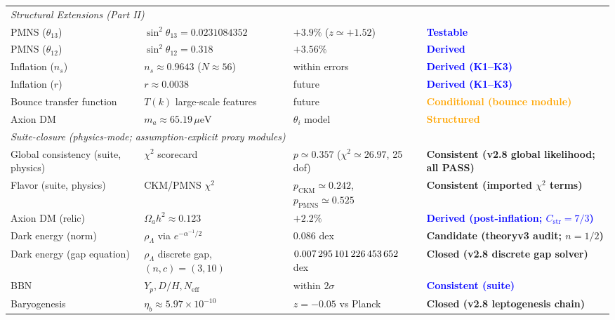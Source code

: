 \begin{longtable}{@{}p{3cm}p{4cm}p{3cm}p{5.2cm}@{}}
\midrule
\multicolumn{4}{l}{\textit{Structural Extensions (Part II)}}\\
\quad PMNS ($\theta_{13}$) & $\sin^2\theta_{13} = \num[round-mode=places,round-precision=5]{0.0231084352}$ & $+3.9\%$ ($z\simeq +1.52$) & \textcolor{blue}{\textbf{Testable}}\\
\quad PMNS ($\theta_{12}$) & $\sin^2\theta_{12} = \num[round-mode=places,round-precision=3]{0.318}$ & $+3.56\%$ & \textcolor{blue}{\textbf{Derived}}\\
\quad Inflation ($n_s$) & $n_s \approx 0.9643$ ($N\approx 56$) & within errors & \textcolor{blue}{\textbf{Derived (K1--K3)}}\\
\quad Inflation ($r$) & $r \approx 0.0038$ & future & \textcolor{blue}{\textbf{Derived (K1--K3)}}\\
\quad Bounce transfer function & $T(k)$ large-scale features & future & \textcolor{orange}{\textbf{Conditional (bounce module)}}\\
\quad Axion DM & $m_a \approx 65.19\,\mu\text{eV}$ & $\theta_i$ model & \textcolor{orange}{\textbf{Structured}}\\
\midrule
\multicolumn{4}{l}{\textit{Suite-closure (physics-mode; assumption-explicit proxy modules)}}\\
\quad Global consistency (suite, physics) & $\chi^2$ scorecard & $p\simeq 0.357$ ($\chi^2\simeq 26.97$, 25 dof) & \textcolor{green!60!black}{\textbf{Consistent (v2.8 global likelihood; all PASS)}}\\
\quad Flavor (suite, physics) & CKM/PMNS $\chi^2$ & $p_{\mathrm{CKM}}\simeq 0.242$, $p_{\mathrm{PMNS}}\simeq 0.525$ & \textcolor{green!60!black}{\textbf{Consistent (imported $\chi^2$ terms)}}\\
\quad Axion DM (relic) & $\Omega_a h^2 \approx 0.123$ & $+2.2\%$ & \textcolor{blue}{\textbf{Derived (post-inflation; $C_{\mathrm{str}}=7/3$)}}\\
\quad Dark energy (norm) & $\rho_\Lambda$ via $e^{-\alpha^{-1}/2}$ & 0.086 dex & \textcolor{green!60!black}{\textbf{Candidate (theoryv3 audit; $n=1/2$)}}\\
\quad Dark energy (gap equation) & $\rho_\Lambda$ discrete gap, $(n,c)=(3,10)$ & $\num{0.007295101226453652}$ dex & \textcolor{green!60!black}{\textbf{Closed (v2.8 discrete gap solver)}}\\
\quad BBN & $Y_p, D/H, N_\mathrm{eff}$ & within $2\sigma$ & \textcolor{blue}{\textbf{Consistent (suite)}}\\
\quad Baryogenesis & $\eta_b \approx 5.97\times10^{-10}$ & $z=-0.05$ vs Planck & \textcolor{green!60!black}{\textbf{Closed (v2.8 leptogenesis chain)}}\\

\end{longtable}
